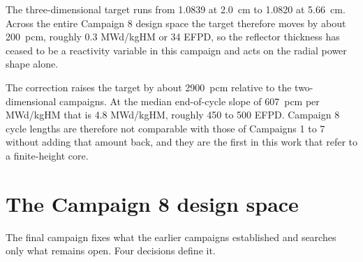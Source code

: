 The three-dimensional target runs from 1.0839 at \SI{2.0}{cm} to
1.0820 at \SI{5.66}{cm}. Across the entire Campaign 8 design space the
target therefore moves by about \SI{200}{pcm}, roughly 0.3 MWd/kgHM or
34 EFPD, so the reflector thickness has ceased to be a reactivity
variable in this campaign and acts on the radial power shape alone.

The correction raises the target by about \SI{2900}{pcm} relative to
the two-dimensional campaigns. At the median end-of-cycle slope of
\SI{607}{pcm} per MWd/kgHM that is 4.8 MWd/kgHM, roughly 450 to 500
EFPD. Campaign 8 cycle lengths are therefore not comparable with those
of Campaigns 1 to 7 without adding that amount back, and they are the
first in this work that refer to a finite-height core.

\section{The Campaign 8 design space}
\label{sec:meth-c8-space}

The final campaign fixes what the earlier campaigns established and
searches only what remains open. Four decisions define it.

